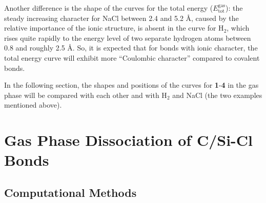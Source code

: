 Another difference is the shape of the curves for the total energy ($E_\mathrm{tot}^\mathrm{gas}$): the steady increasing character for NaCl between 2.4 and 5.2 \AA, caused by the relative importance of the ionic structure, is absent in the curve for H$_2$, which rises quite rapidly to the energy level of two separate hydrogen atoms between 0.8 and roughly 2.5 \AA. So, it is expected that for bonds with ionic character, the total energy curve will exhibit more ``Coulombic character'' compared to covalent bonds. 

In the following section, the shapes and positions of the curves for \textbf{1}-\textbf{4} in the gas phase will be compared with each other and with H$_2$ and NaCl (the two examples mentioned above).

\section{\label{ch3.sec.gasphase}Gas Phase Dissociation of C/Si-Cl Bonds}

\subsection{Computational Methods}

